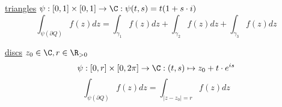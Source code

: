 \begin{example}
  \underline{triangles}
  \newline $\psi:[0,1]\times[0,1]\to \C: \psi(t,s)=t(1+s \cdot i)$
    $$\int_{\psi(\partial Q)}^{}f(z)dz=\int_{\gamma_1}f(z)dz+ \int_{\gamma_2}f(z)dz+\int_{\gamma_3}f(z)dz$$
\end{example}
\begin{example}
  \underline{discs}
  \newline $z_0\in \C, r\in\R_{>0}$
    $$\psi:[0,r]\times[0,2\pi]\to \C:(t,s)\mapsto z_0+t \cdot e^{is}$$
    $$\int_{\psi(\partial Q)}^{ }f(z)dz=\int_{|z-z_0|=r}^{}f(z)dz$$
\end{example}
